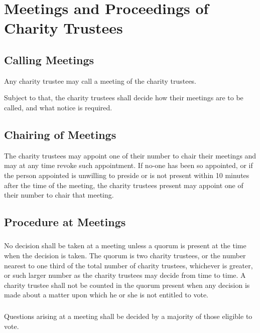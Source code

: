 \section{Meetings and Proceedings of Charity Trustees}\label{sec:meetings}

    \subsection{Calling Meetings}
    Any charity trustee may call a meeting of the charity trustees.

    Subject to that, the charity trustees shall decide how their meetings are to be called, and what notice is required.

    \subsection{Chairing of Meetings}\label{sec:chairing_of_meetings}
    The charity trustees may appoint one of their number to chair their meetings and may at any time revoke such appointment. If no-one has been so appointed, or if the person appointed is unwilling to preside or is not present within 10 minutes after the time of the meeting, the charity trustees present may appoint one of their number to chair that meeting.

    \subsection{Procedure at Meetings}

        \subsubsection{}
        No decision shall be taken at a meeting unless a quorum is present at the time when the decision is taken. The quorum is two charity trustees, or the number nearest to one third of the total number of charity trustees, whichever is greater, or such larger number as the charity trustees may decide from time to time. A charity trustee shall not be counted in the quorum present when any decision is made about a matter upon which he or she is not entitled to vote.

        \subsubsection{}
        Questions arising at a meeting shall be decided by a majority of those eligible to vote.

